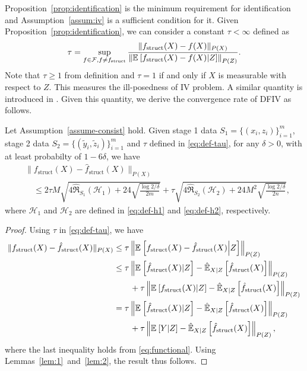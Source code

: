  Proposition~\ref{prop:identification} is the minimum requirement for identification and Assumption~\ref{assum:iv} is a sufficient condition for it. Given Proposition~\ref{prop:identification}, we can consider a constant $\tau < \infty$ defined as
     \begin{align}
         \tau = \sup_{f \in \mathcal{F}, f\neq f_\mathrm{struct}} \frac{\|f_\mathrm{struct}(X) - f(X)\|_{P(X)}}{\left\| \expect{f_\mathrm{struct}(X) - f(X) \middle | Z} \right\|_{P(Z)}}. \label{eq:def-tau}
     \end{align}
 Note that $\tau \geq 1$ from definition and $\tau = 1$ if and only if $X$ is measurable with respect to $Z$. This measures the ill-posedness of IV problem. A similar quantity is introduced in \citep{blundell2007semi-nonparametric}. Given this quantity, we derive the convergence rate of DFIV as follows.

 \begin{thm}\label{thm:totalConsistency}
    Let Assumption~\ref{assume-consist} hold. Given stage 1 data $S_1 = \{(x_i, z_i)\}_{i=1}^m$, stage 2 data $S_2 = \{(\tilde y_i, \tilde z_i)\}_{i=1}^m$ and $\tau$ defined in \eqref{eq:def-tau}, for any $\delta>0$, with at least probabilty of $1-6\delta$, we have
    \begin{align*}
        &\|f_\mathrm{struct}(X) - \hat{f}_\mathrm{struct}(X)\|_{P(X)} \\
        &\quad \leq 2\tau M\sqrt{4\hat{\mathfrak{R}}_{S_1}(\mathcal{H}_1) + 24\sqrt{\frac{\log 2/\delta}{2m}}} + \tau \sqrt{4\hat{\mathfrak{R}}_{S_2}(\mathcal{H}_2) + 24M^2\sqrt{\frac{\log 2/\delta}{2n}}},
    \end{align*}
    where $\mathcal{H}_1$ and $\mathcal{H}_2$ are defined in \eqref{eq:def-h1} and \eqref{eq:def-h2}, respectively.
\end{thm}

\begin{proof}
    Using $\tau$ in \eqref{eq:def-tau}, we have
\begin{align*}
    \|f_\mathrm{struct}(X) - \hat{f}_\mathrm{struct}(X)\|_{P(X)} &\leq \tau \left\| \expect{f_\mathrm{struct}(X) - \hat{f}_\mathrm{struct}(X) \middle | Z} \right\|_{P(Z)}\\
    &\leq \tau \left\| \expect{\hat{f}_\mathrm{struct}(X)|Z} - \hatexpect[X|Z]{\hat{f}_{\mathrm{struct}}(X)} \right\|_{P(Z)}\\
    &\quad \quad +\tau \left\| \expect{f_\mathrm{struct}(X)|Z} - \hatexpect[X|Z]{\hat{f}_{\mathrm{struct}}(X)} \right\|_{P(Z)}\\
    &= \tau \left\| \expect{\hat{f}_\mathrm{struct}(X)|Z} - \hatexpect[X|Z]{\hat{f}_{\mathrm{struct}}(X)} \right\|_{P(Z)}\\
    &\quad \quad +\tau \left\| \expect{Y|Z} - \hatexpect[X|Z]{\hat{f}_{\mathrm{struct}}(X)} \right\|_{P(Z)},
\end{align*}
where the last inequality holds from \eqref{eq:functional}. Using Lemmas~\ref{lem:1}~and~\ref{lem:2}, the result thus follows.
\end{proof}

